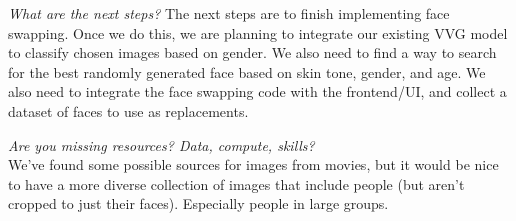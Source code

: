\textit{What are the next steps?}
The next steps are to finish implementing face swapping. Once we do this, we are planning to integrate our existing VVG model to classify chosen images based on gender. We also need to find a way to search for the best randomly generated face based on skin tone, gender, and age.
We also need to integrate the face swapping code with the frontend/UI, and collect a dataset of faces to use as replacements.

%
\textit{Are you missing resources? Data, compute, skills?}\\
We've found some possible sources for images from movies, but it would be nice to have a more diverse collection of images that include people (but aren't cropped to just their faces). Especially people in large groups.


